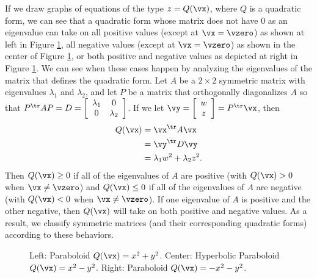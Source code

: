 If we draw graphs of equations of the type $z=Q(\vx)$, where $Q$ is a quadratic form, we can see that a quadratic form whose matrix does not have 0 as an eigenvalue can take on all positive values (except at $\vx=\vzero$) as shown at left in Figure \ref{F:7_b_Paraboloids}, all negative values (except at $\vx=\vzero$) as shown in the center of  Figure \ref{F:7_b_Paraboloids}, or both positive and negative values as depicted at right in Figure \ref{F:7_b_Paraboloids}. We can see when these cases happen by analyzing the eigenvalues of the matrix that defines the quadratic form. Let $A$ be a $2 \times 2$ symmetric matrix with eigenvalues $\lambda_1$ and $\lambda_2$, and let $P$ be a matrix that orthogonally diagonalizes $A$ so that $P^{\tr}AP = D = \left[ \begin{array}{cc} \lambda_1 & 0 \\ 0 & \lambda_2 \end{array} \right]$. If we let $\vy = \left[ \begin{array}{c} w\\z \end{array} \right] = P^{\tr}\vx$, then \begin{align*}
Q(\vx) &= \vx^{\tr}A\vx \\
	&= \vy^{\tr} D \vy \\
	&= \lambda_1 w^2 + \lambda_2 z^2.
\end{align*}
Then $Q(\vx) \geq 0$ if all of the eigenvalues of $A$ are positive (with $Q(\vx) > 0$ when $\vx \neq \vzero$) and $Q(\vx) \leq 0$  if all of the eigenvalues of $A$ are negative (with $Q(\vx) < 0$ when $\vx \neq \vzero$). If one eigenvalue of $A$ is positive and the other negative, then $Q(\vx)$ will take on both positive and negative values. As a result, we classify symmetric matrices (and their corresponding quadratic forms) according to these behaviors.
\begin{figure}[h]
\begin{center}
\caption{Left: Paraboloid $Q(\vx)=x^2+y^2$. Center: Hyperbolic Paraboloid $Q(\vx)=x^2-y^2$. Right: Paraboloid $Q(\vx) = -x^2 - y^2$.}
\label{F:7_b_Paraboloids}
\end{center}
\end{figure}



